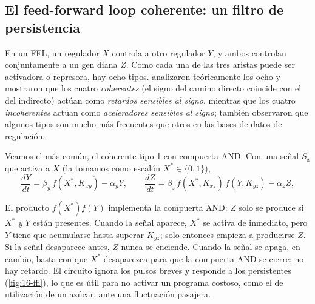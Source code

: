 \subsection{El feed-forward loop coherente: un filtro de persistencia}

En un FFL, un regulador $X$ controla a otro regulador $Y$, y ambos controlan conjuntamente a un gen diana $Z$. Como cada una de las tres aristas puede ser activadora o represora, hay ocho tipos. \textcite{c16-mangan2003} analizaron teóricamente los ocho y mostraron que los cuatro \emph{coherentes} (el signo del camino directo coincide con el del indirecto) actúan como \emph{retardos sensibles al signo}, mientras que los cuatro \emph{incoherentes} actúan como \emph{aceleradores sensibles al signo}; también observaron que algunos tipos son mucho más frecuentes que otros en las bases de datos de regulación.

Veamos el más común, el coherente tipo 1 con compuerta AND. Con una señal $S_x$ que activa a $X$ (la tomamos como escalón $X^*\in\{0,1\}$),
\begin{equation}\label{eq:16-ffl}
\frac{dY}{dt}=\beta_y\,f(X^*,K_{xy})-\alpha_y Y,\qquad
\frac{dZ}{dt}=\beta_z\,f(X^*,K_{xz})\,f(Y,K_{yz})-\alpha_z Z,
\end{equation}
\begin{simbolos}
\end{simbolos}
El producto $f(X^*)f(Y)$ implementa la compuerta AND: $Z$ solo se produce si $X^*$ \emph{y} $Y$ están presentes. Cuando la señal aparece, $X^*$ se activa de inmediato, pero $Y$ tiene que acumularse hasta superar $K_{yz}$; solo entonces empieza a producirse $Z$. Si la señal desaparece antes, $Z$ nunca se enciende. Cuando la señal se apaga, en cambio, basta con que $X^*$ desaparezca para que la compuerta AND se cierre: no hay retardo. El circuito ignora los pulsos breves y responde a los persistentes (\cref{fig:16-ffl}), lo que es útil para no activar un programa costoso, como el de utilización de un azúcar, ante una fluctuación pasajera.

